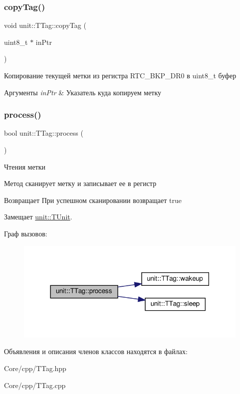 \subsubsection{\texorpdfstring{copy\+Tag()}{copyTag()}}
{\footnotesize\ttfamily void unit\+::\+T\+Tag\+::copy\+Tag (\begin{DoxyParamCaption}\item[{uint8\+\_\+t $\ast$}]{in\+Ptr }\end{DoxyParamCaption})}



Копирование текущей метки из регистра R\+T\+C\+\_\+\+B\+K\+P\+\_\+\+D\+R0 в uint8\+\_\+t буфер 



 
\begin{DoxyParams}{Аргументы}
{\em in\+Ptr} & Указатель куда копируем метку \\
\hline
\end{DoxyParams}
\mbox{\label{classunit_1_1_t_tag_a1dfd588909730d0b48edbeda273526fe}} 
\subsubsection{\texorpdfstring{process()}{process()}}
{\footnotesize\ttfamily bool unit\+::\+T\+Tag\+::process (\begin{DoxyParamCaption}{ }\end{DoxyParamCaption})\hspace{0.3cm}{\ttfamily [virtual]}}



Чтения метки 

Метод сканирует метку и записывает ее в регистр \begin{DoxyReturn}{Возвращает}
При успешном сканировании возвращает true 
\end{DoxyReturn}


Замещает \hyperlink{classunit_1_1_t_unit_a108691c8b988d97c65237c83a31db706}{unit\+::\+T\+Unit}.

Граф вызовов\+:\nopagebreak
\begin{figure}[H]
\begin{center}
\leavevmode
\includegraphics[width=318pt]{classunit_1_1_t_tag_a1dfd588909730d0b48edbeda273526fe_cgraph}
\end{center}
\end{figure}


Объявления и описания членов классов находятся в файлах\+:\begin{DoxyCompactItemize}
\item 
Core/cpp/T\+Tag.\+hpp\item 
Core/cpp/T\+Tag.\+cpp\end{DoxyCompactItemize}
